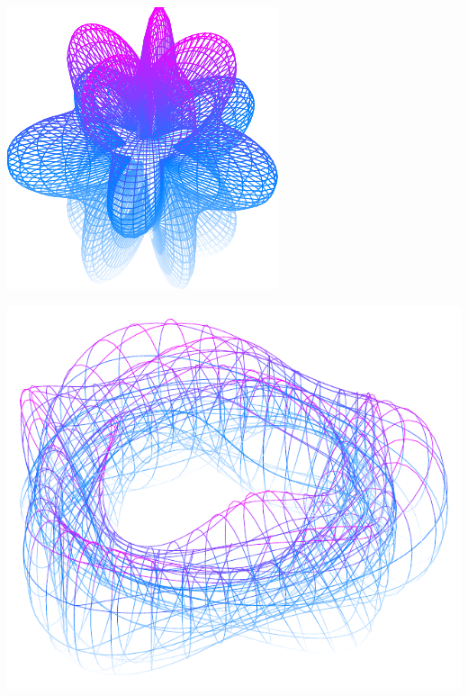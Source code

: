 \documentclass[11pt,openany]{article}
\begin{document}
\begin{center}
\begin{minipage}{.32\textwidth}\centering
	\includegraphics[scale=.8]{../tikz/grad-math-tikz-pdf/sphere3.pdf}
\end{minipage}\hfill
\begin{minipage}{.32\textwidth}\centering
	\includegraphics[scale=.45]{../tikz/grad-math-tikz-pdf/torus3.pdf}
\end{minipage}\hfill
\begin{minipage}{.32\textwidth}\centering

\end{minipage}
\end{center}
\end{document}
